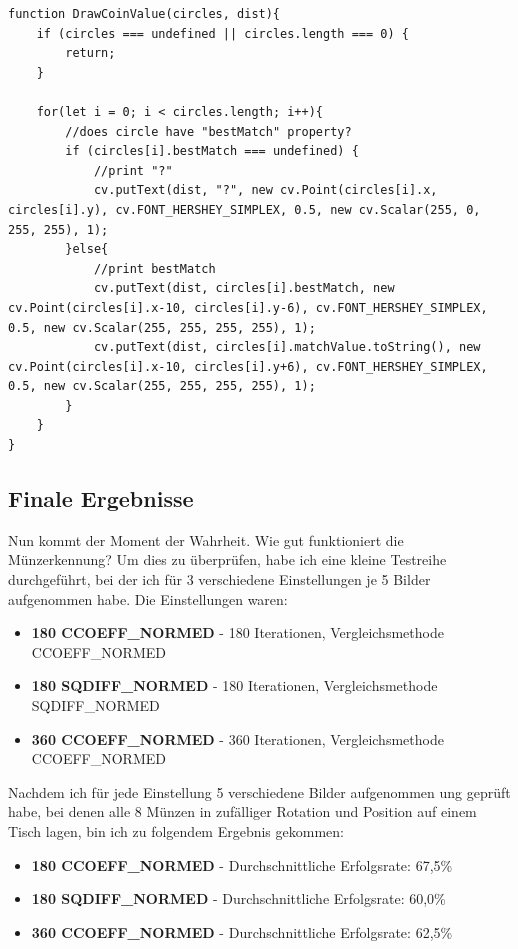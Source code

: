 \begin{lstlisting}[style=JavaScript]
function DrawCoinValue(circles, dist){
    if (circles === undefined || circles.length === 0) {
        return;
    }

    for(let i = 0; i < circles.length; i++){
        //does circle have "bestMatch" property?
        if (circles[i].bestMatch === undefined) {
            //print "?"
            cv.putText(dist, "?", new cv.Point(circles[i].x, circles[i].y), cv.FONT_HERSHEY_SIMPLEX, 0.5, new cv.Scalar(255, 0, 255, 255), 1);
        }else{
            //print bestMatch
            cv.putText(dist, circles[i].bestMatch, new cv.Point(circles[i].x-10, circles[i].y-6), cv.FONT_HERSHEY_SIMPLEX, 0.5, new cv.Scalar(255, 255, 255, 255), 1);
            cv.putText(dist, circles[i].matchValue.toString(), new cv.Point(circles[i].x-10, circles[i].y+6), cv.FONT_HERSHEY_SIMPLEX, 0.5, new cv.Scalar(255, 255, 255, 255), 1);
        }
    }
}
\end{lstlisting}

\subsection{Finale Ergebnisse}
Nun kommt der Moment der Wahrheit. Wie gut funktioniert die Münzerkennung? Um dies zu überprüfen, habe ich eine kleine Testreihe durchgeführt, bei der ich für 3 verschiedene Einstellungen je 5 Bilder aufgenommen habe. Die Einstellungen waren:

\begin{itemize}
    \item \textbf{180 CCOEFF\_NORMED} - 180 Iterationen, Vergleichsmethode CCOEFF\_NORMED
    \item \textbf{180 SQDIFF\_NORMED} - 180 Iterationen, Vergleichsmethode SQDIFF\_NORMED
    \item \textbf{360 CCOEFF\_NORMED} - 360 Iterationen, Vergleichsmethode CCOEFF\_NORMED
\end{itemize}

Nachdem ich für jede Einstellung 5 verschiedene Bilder aufgenommen ung geprüft habe, bei denen alle 8 Münzen in zufälliger Rotation und Position auf einem Tisch lagen, bin ich zu folgendem Ergebnis gekommen:

\begin{itemize}
    \item \textbf{180 CCOEFF\_NORMED} - Durchschnittliche Erfolgsrate: 67,5\%
    \item \textbf{180 SQDIFF\_NORMED} - Durchschnittliche Erfolgsrate: 60,0\%
    \item \textbf{360 CCOEFF\_NORMED} - Durchschnittliche Erfolgsrate: 62,5\%
\end{itemize}


